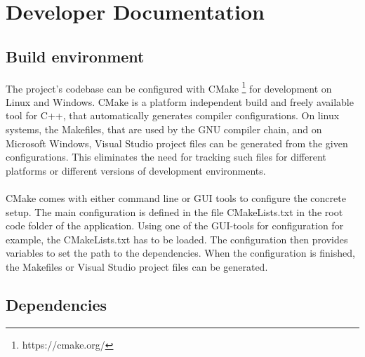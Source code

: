 \section{Developer Documentation}\label{sec:devdoc}


\subsection{Build environment}

The project’s codebase can be configured with CMake \footnote{https://cmake.org/} for development on Linux and Windows. CMake is a platform independent build and freely available tool for C++, that automatically generates compiler configurations. On linux systems, the Makefiles, that are used by the GNU compiler chain, and on Microsoft Windows, Visual Studio project files can be generated from the given configurations. This eliminates the need for tracking such files for different platforms or different versions of development environments.
\\
\\
CMake comes with either command line or GUI tools to configure the concrete setup. The main configuration is defined in the file CMakeLists.txt in the root code folder of the application. Using one of the GUI-tools for configuration for example, the CMakeLists.txt has to be loaded. The configuration then provides variables to set the path to the dependencies. When the configuration is finished, the Makefiles or Visual Studio project files can be generated.


\subsection{Dependencies}

